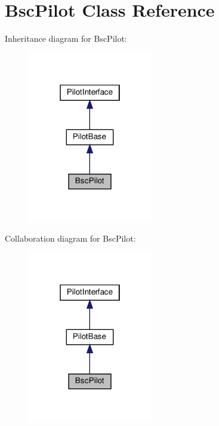 \hypertarget{classBscPilot}{}\section{Bsc\+Pilot Class Reference}
\label{classBscPilot}


Inheritance diagram for Bsc\+Pilot\+:\nopagebreak
\begin{figure}[H]
\begin{center}
\leavevmode
\includegraphics[width=154pt]{classBscPilot__inherit__graph}
\end{center}
\end{figure}


Collaboration diagram for Bsc\+Pilot\+:\nopagebreak
\begin{figure}[H]
\begin{center}
\leavevmode
\includegraphics[width=154pt]{classBscPilot__coll__graph}
\end{center}
\end{figure}
